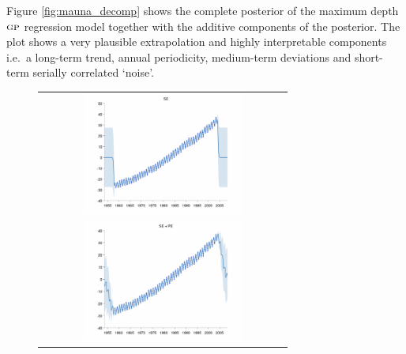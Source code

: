 \documentclass[twoside]{article}
\begin{document}
Figure \ref{fig:mauna_decomp} shows the complete posterior of the maximum depth ${\textsc{gp}}$ regression model together with the additive components of the posterior.
The plot shows a very plausible extrapolation and highly interpretable components i.e.~a long-term trend, annual periodicity, medium-term deviations and short-term serially correlated `noise'.

\begin{figure}[h!]
\centering
\newcommand{\wmg}{8cm}  %
\newcommand{\hmg}{4cm}  %
\begin{tabular}{c}
 \includegraphics[width=\wmg,height=\hmg]{../figures/decomposition/03-mauna2003_max_level_0/03-mauna2003_all} \\ 
 \includegraphics[width=\wmg,height=\hmg]{../figures/decomposition/03-mauna2003_max_level_1/03-mauna2003_all} \\

\end{tabular}
\end{figure}
\end{document}
